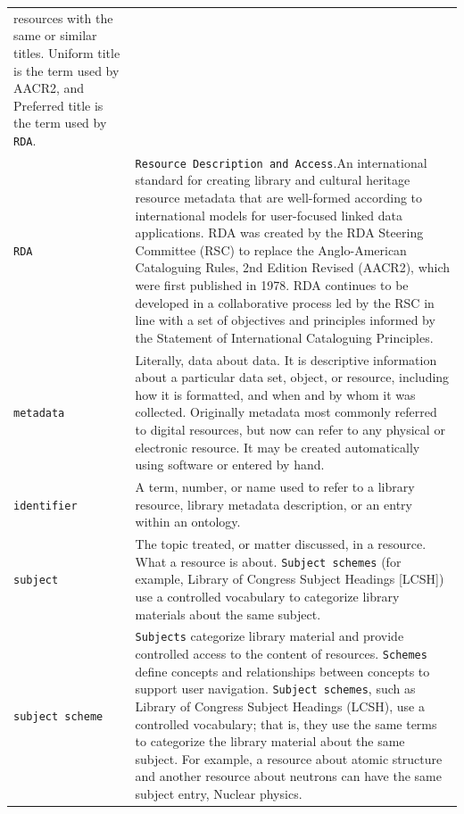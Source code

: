 \documentclass[
  letterpaper,
  DIV=11,
  numbers=noendperiod]{scrreprt}
\begin{document}
\begin{longtable}[]{@{}
  >{\raggedright\arraybackslash}p{}
  >{\raggedright\arraybackslash}p{}@{}}
resources with the same or similar titles. Uniform title is the term
used by AACR2, and Preferred title is the term used by \texttt{RDA}. \\
\texttt{RDA} & \texttt{Resource\ Description\ and\ Access}.An
international standard for creating library and cultural heritage
resource metadata that are well-formed according to international models
for user-focused linked data applications. RDA was created by the RDA
Steering Committee (RSC) to replace the Anglo-American Cataloguing
Rules, 2nd Edition Revised (AACR2), which were first published in 1978.
RDA continues to be developed in a collaborative process led by the RSC
in line with a set of objectives and principles informed by the
Statement of International Cataloguing Principles. \\
\texttt{metadata} & Literally, data about data. It is descriptive
information about a particular data set, object, or resource, including
how it is formatted, and when and by whom it was collected. Originally
metadata most commonly referred to digital resources, but now can refer
to any physical or electronic resource. It may be created automatically
using software or entered by hand. \\
\texttt{identifier} & A term, number, or name used to refer to a library
resource, library metadata description, or an entry within an
ontology. \\
\texttt{subject} & The topic treated, or matter discussed, in a
resource. What a resource is about. \texttt{Subject\ schemes} (for
example, Library of Congress Subject Headings {[}LCSH{]}) use a
controlled vocabulary to categorize library materials about the same
subject. \\
\texttt{subject\ scheme} & \texttt{Subjects} categorize library material
and provide controlled access to the content of resources.
\texttt{Schemes} define concepts and relationships between concepts to
support user navigation. \texttt{Subject\ schemes}, such as Library of
Congress Subject Headings (LCSH), use a controlled vocabulary; that is,
they use the same terms to categorize the library material about the
same subject. For example, a resource about atomic structure and another
resource about neutrons can have the same subject entry, Nuclear
physics. \\
\end{longtable}

\section*{}\label{section}
\end{document}

